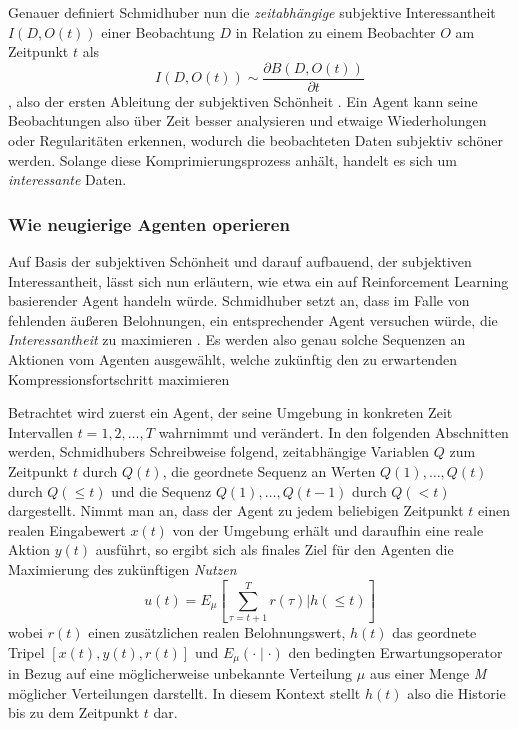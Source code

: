 Genauer definiert Schmidhuber nun die \emph{zeitabhängige} subjektive Interessantheit \(I(D,O(t))\) einer Beobachtung \(D\) in Relation zu einem Beobachter \(O\) am Zeitpunkt \(t\) als 
\begin{equation}
    I(D,O(t)) \sim \frac{\partial B(D,O(t))}{\partial t}
\end{equation}
, also der ersten Ableitung der subjektiven Schönheit \cite[p.~8]{curiosity_schmidhuber}.
Ein Agent kann seine Beobachtungen also über Zeit besser analysieren und etwaige Wiederholungen oder Regularitäten erkennen, wodurch die beobachteten Daten subjektiv schöner werden. Solange diese Komprimierungsprozess anhält, handelt es sich um \emph{interessante} Daten. \cite[p.~8]{curiosity_schmidhuber}


\subsubsection{Wie neugierige Agenten operieren}
Auf Basis der subjektiven Schönheit und darauf aufbauend, der subjektiven Interessantheit, lässt sich nun erläutern, wie etwa ein auf Reinforcement Learning basierender Agent handeln würde. 
Schmidhuber setzt an, dass im Falle von fehlenden äußeren Belohnungen, ein entsprechender Agent versuchen würde, die \emph{Interessantheit} zu maximieren \cite[p.~8]{curiosity_schmidhuber}.
Es werden also genau solche Sequenzen an Aktionen vom Agenten ausgewählt, welche zukünftig den zu erwartenden Kompressionsfortschritt maximieren \cite[p.~8]{curiosity_schmidhuber}

Betrachtet wird zuerst ein Agent, der seine Umgebung in konkreten Zeit Intervallen \(t = 1,2, \dots ,T\) wahrnimmt und verändert. 
In den folgenden Abschnitten werden, Schmidhubers Schreibweise folgend, zeitabhängige Variablen \(Q\) zum Zeitpunkt \(t\) durch \(Q(t)\), die geordnete Sequenz an Werten \(Q(1), \dots,Q(t)\) durch \(Q(\leq t)\) und die Sequenz \(Q(1), \dots, Q(t-1)\) durch \(Q(<t)\) dargestellt.
Nimmt man an, dass der Agent zu jedem beliebigen Zeitpunkt \(t\) einen realen Eingabewert \(x(t)\) von der Umgebung erhält und daraufhin eine reale Aktion \(y(t)\) ausführt, so ergibt sich als finales Ziel für den Agenten die Maximierung des zukünftigen \emph{Nutzen} 
\begin{equation}
  u(t) = E_\mu \left[ \sum^T_{\tau=t+1} r(\tau) \bigl\lvert h(\leq t)\right]  
\end{equation}
wobei \(r(t)\) einen zusätzlichen realen Belohnungswert, \(h(t)\) das geordnete Tripel \(\left[ x(t),y(t),r(t)\right]\) und \(E_\mu(\cdot \mid \cdot)\) den bedingten Erwartungsoperator in Bezug auf eine möglicherweise unbekannte Verteilung \(\mu\) aus einer Menge \emph{M} möglicher Verteilungen darstellt. \cite[p.~17]{curiosity_schmidhuber}
In diesem Kontext stellt \(h(t)\) also die Historie bis zu dem Zeitpunkt \(t\) dar.

